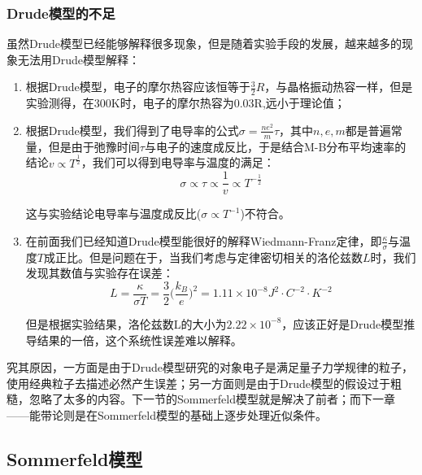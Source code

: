 \documentclass{ctexart}
\begin{document}
             \subsubsection{Drude模型的不足}
                虽然Drude模型已经能够解释很多现象，但是随着实验手段的发展，越来越多的现象无法用Drude模型解释：
                \begin{enumerate}
                    \item 根据Drude模型，电子的摩尔热容应该恒等于$\frac{3}{2}R$，与晶格振动热容一样，但是实验测得，在300K时，电子的摩尔热容为0.03R,远小于理论值；
                    \item 根据Drude模型，我们得到了电导率的公式$\sigma=\frac{ne^2}{m}\tau$，其中$n,e,m$都是普遍常量，但是由于弛豫时间$\tau$与电子的速度成反比，于是结合M-B分布平均速率的结论$v\propto T^{\frac{1}{2}}$，我们可以得到电导率与温度的满足：
                    \begin{equation}
                        \sigma\propto \tau \propto \frac{1}{v}\propto T^{-\frac{1}{2}}
                    \end{equation}
                    
                    这与实验结论电导率与温度成反比($\sigma\propto T^{-1}$)不符合。
                    \item 在前面我们已经知道Drude模型能很好的解释Wiedmann-Franz定律，即$\frac{\kappa}{\sigma}$与温度$T$成正比。但是问题在于，当我们考虑与定律密切相关的洛伦兹数$L$时，我们发现其数值与实验存在误差：
                    \begin{equation}
                        L=\frac{\kappa}{\sigma T}=\frac{3}{2}\Big(\frac{k_B}{e}\Big)^2=1.11\times 10^{-8}J^2\cdot C^{-2}\cdot K^{-2}
                    \end{equation}
                    
                    但是根据实验结果，洛伦兹数L的大小为$2.22\times 10^{-8}$，应该正好是Drude模型推导结果的一倍，这个系统性误差难以解释。
                \end{enumerate}
                
                究其原因，一方面是由于Drude模型研究的对象电子是满足量子力学规律的粒子，使用经典粒子去描述必然产生误差；另一方面则是由于Drude模型的假设过于粗糙，忽略了太多的内容。下一节的Sommerfeld模型就是解决了前者；而下一章——能带论则是在Sommerfeld模型的基础上逐步处理近似条件。
             \subsection{Sommerfeld模型}
    
\end{document}
